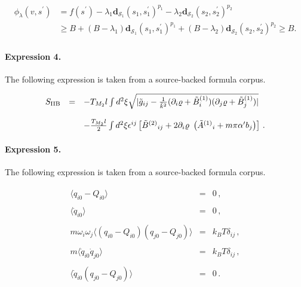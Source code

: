 \documentclass[11pt]{article}
\begin{document}
\begin{align*}\begin{aligned}\phi_\lambda (v, s^{\prime})&=f (s^{\prime})-\lambda_1 \boldsymbol{d}_{\mathcal{S}_1} (s_1, s_1^{\prime})^{p_1} -\lambda_2 \boldsymbol{d}_{ \mathcal{S}_2} (s_2, s_2^{\prime})^{p_2} \\& \geq B + (B - \lambda_1) \boldsymbol{d}_{\mathcal{S}_1} (s_1, s_1^\prime )^{p_1} + (B - \lambda_2) \boldsymbol{d}_{ \mathcal{S}_2 }(s_2, s_2^\prime )^{p_2} \geq B.\end{aligned}\end{align*}

\paragraph{Expression 4.} The following expression is taken from a source-backed formula corpus.

\begin{align*}\begin{array}{rcl}S_{{\rm IIB}} & = & -T_{M_2}l\int d^2\xi\sqrt{|{\tilde g}_{ij}-\frac{1}{{\tilde k}^2}(\partial_i \varrho+{\tilde B}^{(1)}_i)(\partial_j \varrho+{\tilde B}^{(1)}_j)|}\\& & \\& &-\frac{T_{M_2}l}{2}\int d^2\xi\epsilon^{ij}\left[\tilde{B}^{(2)}{}_{ij}+2\partial_{i}\varrho\ \left({\tilde A}^{(1)}{}_{i}+m\pi\alpha^{\prime} b_{j}\right)\right]\, .\\\end{array}\end{align*}

\paragraph{Expression 5.} The following expression is taken from a source-backed formula corpus.

\begin{align*}\begin{array}{lll}\langle q_{i0} - Q_{i0} \rangle & = & 0 \, , \\&& \\\langle \dot{q}_{i0} \rangle & = & 0 \, , \\&& \\m\omega_{i}\omega_{j} \langle (q_{i0}-Q_{i0})(q_{j0}-Q_{j0}) \rangle & = & k_{B}T \delta_{ij} \, , \\&& \\m\langle \dot{q}_{i0}\dot{q}_{j0} \rangle & = & k_{B}T\delta_{ij} \, , \\&& \\\langle \dot{q}_{i0}(q_{j0} - Q_{j0}) \rangle & = & 0 \, .\end{array}\end{align*}
\end{document}
